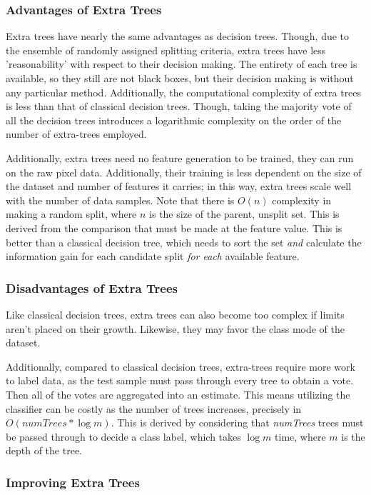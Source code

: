 \subsubsection{Advantages of Extra Trees}

Extra trees have nearly the same advantages as decision trees. Though, due to the ensemble of randomly assigned splitting criteria, extra trees have less 'reasonability' with respect to their decision making. The entirety of each tree is available, so they still are not black boxes, but their decision making is without any particular method. Additionally, the computational complexity of extra trees is less than that of classical decision trees. Though, taking the majority vote of all the decision trees introduces a logarithmic complexity on the order of the number of extra-trees employed. 

Additionally, extra trees need no feature generation to be trained, they can run on the raw pixel data. Additionally, their training is less dependent on the size of the dataset and number of features it carries; in this way, extra trees scale well with the number of data samples. Note that there is $O(n)$ complexity in making a random split, where $n$ is the size of the parent, unsplit set. This is derived from the comparison that must be made at the feature value. This is better than a classical decision tree, which needs to sort the set \emph{and} calculate the information gain for each candidate split \emph{for each} available feature.

\subsubsection{Disadvantages of Extra Trees}

Like classical decision trees, extra trees can also become too complex if limits aren't placed on their growth. Likewise, they may favor the class mode of the dataset. 

Additionally, compared to classical decision trees, extra-trees require more work to label data, as the test sample must pass through every tree to obtain a vote. Then all of the votes are aggregated into an estimate. This means utilizing the classifier can be costly as the number of trees increases, precisely in $O(numTrees\ast \log m)$. This is derived by considering that \textit{numTrees} trees must be passed through to decide a class label, which takes $\log m$ time, where $m$ is the depth of the tree.

\subsubsection{Improving Extra Trees}

